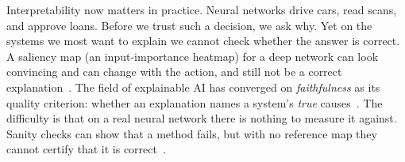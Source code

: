 
Interpretability now matters in practice. Neural networks drive cars, read scans, and
approve loans. Before we trust such a decision, we ask why. Yet on the systems we most
want to explain we cannot check whether the answer is correct. A saliency map (an input-importance heatmap) for a deep
network can look convincing and can change with the action, and still not be a correct
explanation~\cite{greydanus2018visualizing}. The field of explainable AI has converged on
\emph{faithfulness} as its quality criterion: whether an explanation names a system's
\emph{true} causes~\cite{jacovi2020towards}. The difficulty is that on a real neural
network there is nothing to measure it against. Sanity checks can show that a method fails,
but with no reference map they cannot certify that it is correct~\cite{adebayo2018sanity}.

